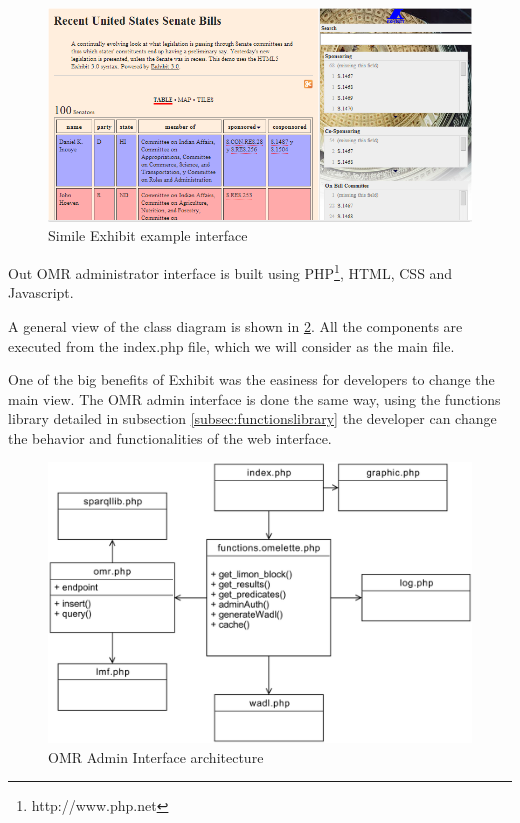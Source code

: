 \begin{figure}[h]
	\centering
	\includegraphics[width=350pt]{graphics/exhibitsimile.png}
	\caption{Simile Exhibit example interface}
	\label{fig:generatingblocks}
\end{figure}

Out OMR administrator interface is  built using PHP\footnote{http://www.php.net}, HTML, CSS and Javascript.

A general view of the class diagram is shown in \ref{fig:admininterface}. All the components are executed from the index.php file, which we will consider as the main file.

One of the big benefits of Exhibit was the easiness for developers to change the main view. The OMR admin interface is done the same way, using the functions library detailed in subsection \ref{subsec:functionslibrary} the developer can change the behavior and functionalities of the web interface.

\begin{figure}[ht!]
	\centering
	\includegraphics[width=400pt]{graphics/omr-interface-architecure.pdf}
	\caption{OMR Admin Interface architecture}
	\label{fig:admininterface}
\end{figure}

